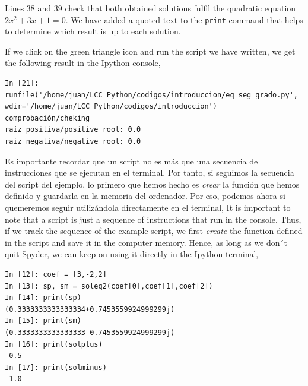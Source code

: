 \begin{paracol}{2}
     Lines $38$ and $39$ check that both obtained solutions fulfil the quadratic equation $2x^2+3x+1 = 0$. We have added a quoted text to the \texttt{print} command that helps to determine which result is up to each solution.

     If we click on the green triangle icon and run the script we have written, we get the following result in the Ipython console,
     
\end{paracol}

\begin{verbatim}
In [21]: runfile('/home/juan/LCC_Python/codigos/introduccion/eq_seg_grado.py',
wdir='/home/juan/LCC_Python/codigos/introduccion')
comprobación/cheking
raíz positiva/positive root: 0.0
raiz negativa/negative root: 0.0  
\end{verbatim}

\begin{paracol}{2}
Es importante recordar que un script no es más que una secuencia de instrucciones que se ejecutan en el terminal. Por tanto, si seguimos la secuencia del script del ejemplo, lo primero que hemos hecho es \emph{crear} la función que hemos definido y guardarla en la memoria del ordenador. Por eso, podemos ahora si quemeremos seguir utilizándola directamente en el terminal,
\switchcolumn
It is important to note that a script is just a sequence of instructions that run in the console. Thus, if we track the sequence of the example script, we first \emph{create} the function defined in the script and save it in the computer memory. Hence, as long as we don´t quit Spyder,  we can keep on using it directly in the Ipython terminal,  
\end{paracol}

\begin{verbatim}
In [12]: coef = [3,-2,2]
In [13]: sp, sm = soleq2(coef[0],coef[1],coef[2])
In [14]: print(sp)
(0.3333333333333334+0.7453559924999299j)
In [15]: print(sm)
(0.3333333333333333-0.7453559924999299j)
In [16]: print(solplus)
-0.5
In [17]: print(solminus)
-1.0   
\end{verbatim}

